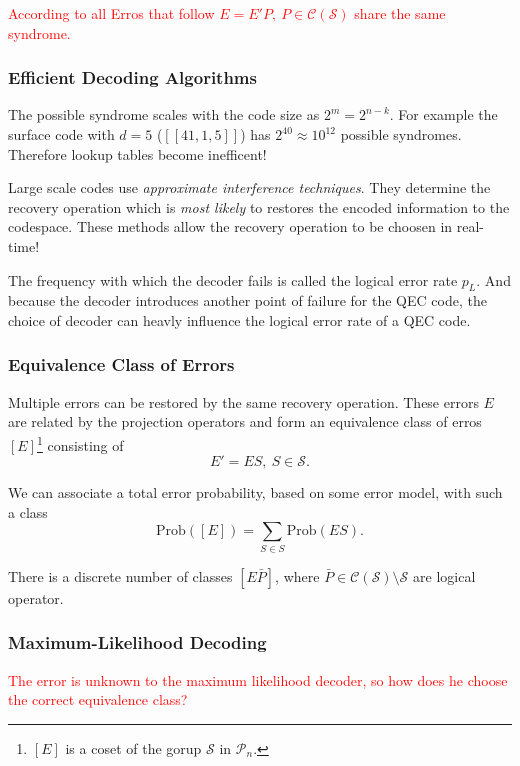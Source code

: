 \textcolor{red}{
    According to \cite{QECmemory} all Erros that follow $E=E'P,\ P \in \mathcal{C}(\mathcal{S})$ share the same syndrome.
}



\subsubsection{Efficient Decoding Algorithms}
The possible syndrome scales with the code size as $2^m = 2^{n-k}$.
For example the surface code with $d=5$ ($[[41,1,5]]$) has $2^{40}\approx 10^{12}$ possible syndromes. 
Therefore lookup tables become inefficent! \cite{QECintro}

Large scale codes use \textit{approximate interference techniques}.
They determine the recovery operation which is \textit{most likely} to restores the encoded information to the codespace.
These methods allow the recovery operation to be choosen in real-time! \cite{QECintro}

The frequency with which the decoder fails is called the logical error rate $p_L$. 
And because the decoder introduces another point of failure for the QEC code, the choice of decoder can heavly influence the logical error rate of a QEC code.  \cite{QECintro}


\subsubsection{Equivalence Class of Errors}
Multiple errors can be restored by the same recovery operation.
These errors $E$ are related by the projection operators and form an equivalence class of erros $[E]$\footnote{
    $[E]$ is a coset of the gorup $\mathcal{S}$ in $\mathcal{P}_n$. 
} consisting of
\begin{equation}
    E' = ES, \  S \in \mathcal{S}.
\end{equation}

We can associate a total error probability, based on some error model, with such a class 
\begin{equation}
    \text{Prob}([E]) = \sum_{S\in S} \text{Prob}(ES).
\end{equation}

There is a discrete number of classes $[E\bar{P}]$, where $\bar{P}\in \mathcal{C}(\mathcal{S}) \setminus \mathcal{S}$ are logical operator. \cite{QECmemory}



\subsubsection{Maximum-Likelihood Decoding}
\textcolor{red}{The error is unknown to the maximum likelihood decoder, so how does he choose the correct equivalence class?}

